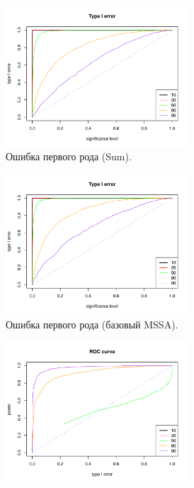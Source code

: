 \documentclass[specialist,
substylefile = spbu_report.rtx,
subf,href,colorlinks=true, 12pt]{disser}
\theoremstyle{definition}
\begin{document}
\begin{figure}
	\captionsetup[subfigure]{justification=Centering}
	\begin{subfigure}[t]{0.45\textwidth}
		\centering
		\includegraphics[width=0.75\textwidth]{img/type1error_sum_fa.pdf}
		\caption{Ошибка первого рода (Sum).}
		\label{fig:sum_fa_a}
	\end{subfigure}\hspace{\fill}
	\begin{subfigure}[t]{0.45\textwidth}
		\centering
		\includegraphics[width=0.75\textwidth]{img/type1error_mssa_fa.pdf}
		\caption{Ошибка первого рода (базовый MSSA).}
	\end{subfigure}
	\bigskip
	\begin{subfigure}[t]{0.45\textwidth}
		\centering
		\includegraphics[width=0.75\textwidth]{img/roc_sum_fa.pdf}

\end{subfigure}
\end{figure}
\end{document}

